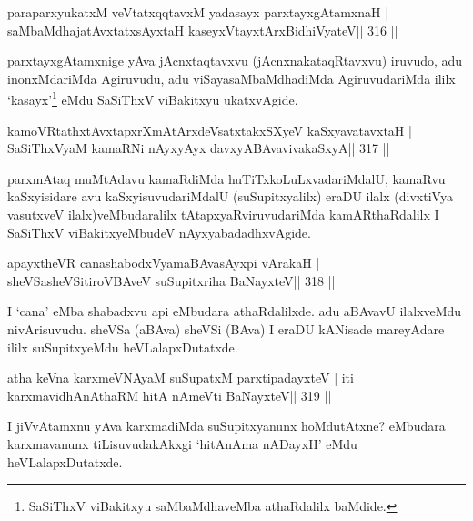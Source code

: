 \begin{shl}
paraparxyukatxM veVtatxqqtavxM yadasayx parxtayxgAtamxnaH |
saMbaMdhajatAvxtatxsAyxtaH kaseyxVtayxtArxBidhiVyateV\hfill || 316 ||
\end{shl}

\begin{artha}
parxtayxgAtamxnige yAva jAcnxtaqtavxvu (jAcnxnakataqRtavxvu) iruvudo, 
adu inonxMdariMda Agiruvudu, adu viSayasaMbaMdhadiMda AgiruvudariMda ililx `kasayx'\footnote[3]{SaSiThxV viBakitxyu saMbaMdhaveMba athaRdalilx baMdide.} eMdu SaSiThxV viBakitxyu ukatxvAgide.
\end{artha}


\begin{shl}
kamoVRtathxtAvxtapxrXmAtArxdeVsatxtakxSXyeV kaSxyavatavxtaH |
SaSiThxVyaM kamaRNi nAyxyAyx davxyABAvavivakaSxyA\hfill || 317 ||
\end{shl}

\begin{artha}
parxmAtaq muMtAdavu kamaRdiMda huTiTxkoLuLxvadariMdalU, kamaRvu  kaSxyisidare avu kaSxyisuvudariMdalU (suSupitxyalilx) eraDU ilalx  (divxtiVya vasutxveV ilalx)veMbudaralilx tAtapxyaRviruvudariMda  kamARthaRdalilx I SaSiThxV viBakitxyeMbudeV nAyxyabadadhxvAgide.
\end{artha}


\begin{shl}
apayxtheVR canashabodxV\s yamaBAvasAyxpi vArakaH |
sheVSasheVSitiroVBAveV suSupitxriha BaNayxteV\hfill || 318 ||
\end{shl}

\begin{artha}
I `cana' eMba shabadxvu api eMbudara athaRdalilxde. adu aBAvavU ilalxveMdu nivArisuvudu. sheVSa (aBAva) sheVSi (BAva) I eraDU kANisade mareyAdare ililx suSupitxyeMdu heVLalapxDutatxde.
\end{artha}


\begin{shl}
atha keVna karxmeVNAyaM suSupatxM parxtipadayxteV |
iti karxmavidhAnAthaRM hitA nAmeVti BaNayxteV\hfill || 319 ||
\end{shl}

\begin{artha}
I jiVvAtamxnu yAva karxmadiMda suSupitxyanunx hoMdutAtxne? eMbudara  karxmavanunx tiLisuvudakAkxgi `hitAnAma nADayxH' eMdu heVLalapxDutatxde.
\end{artha}

